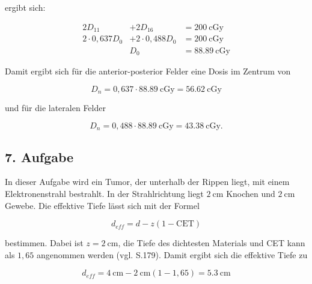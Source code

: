 ergibt sich:

\begin{align*}
  2 D_{11} &+ 2 D_{16} &= \SI{200}{\centi\gray} \\
  2 \cdot 0,637 D_0 &+ 2 \cdot 0,488 D_0 &= \SI{200}{\centi\gray} \\
   & D_0 &= \SI{88.89}{\centi\gray}
\end{align*}

Damit ergibt sich für die anterior-posterior Felder eine Dosis im Zentrum von

\begin{equation*}
  D_n = 0,637 \cdot \SI{88.89}{\centi\gray} = \SI{56.62}{\centi\gray}
\end{equation*}

und für die lateralen Felder

\begin{equation*}
  D_n = 0,488 \cdot \SI{88.89}{\centi\gray} = \SI{43.38}{\centi\gray}.
\end{equation*}

\subsection*{7. Aufgabe}

In dieser Aufgabe wird ein Tumor, der unterhalb der Rippen liegt, mit einem
Elektronenstrahl bestrahlt. In der Strahlrichtung liegt $\SI{2}{\centi\meter}$
Knochen und $\SI{2}{\centi\meter}$ Gewebe. Die effektive Tiefe lässt sich
mit der Formel

\begin{equation*}
  d_{eff} = d - z(1-\text{CET})
\end{equation*}

bestimmen. Dabei ist $z = \SI{2}{\centi\meter}$, die Tiefe des dichtesten
Materials und CET kann als $1,65$ angenommen werden (vgl. S.179). Damit
ergibt sich die effektive Tiefe zu

\begin{equation*}
  d_{eff} = \SI{4}{\centi\meter} - \SI{2}{\centi\meter} (1 - 1,65) = \SI{5.3}{\centi\meter}
\end{equation*}
